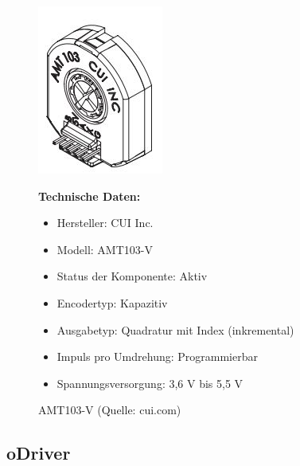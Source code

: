 \begin{figure}[htb]
	\centering
	\begin{minipage}{0.38\linewidth}
		\centering
		\includegraphics[scale=0.9]{images/Entcoder.jpg}
		\caption{AMT103-V  \newline (Quelle: cui.com)}
		\label{Endcoder}
	\end{minipage}
	\begin{minipage}[h]{0.6\textwidth}
		\textbf{Technische Daten:}
		\begin{itemize}
			\item Hersteller: CUI Inc.
			\item Modell:	AMT103-V
			\item Status der Komponente:	Aktiv
			\item Encodertyp:	Kapazitiv
			\item Ausgabetyp: Quadratur mit Index (inkremental)
			\item Impuls pro Umdrehung: Programmierbar
			\item Spannungsversorgung:	3,6 V bis 5,5 V
		\end{itemize}
	\end{minipage}
\end{figure}


\subsection{oDriver}

